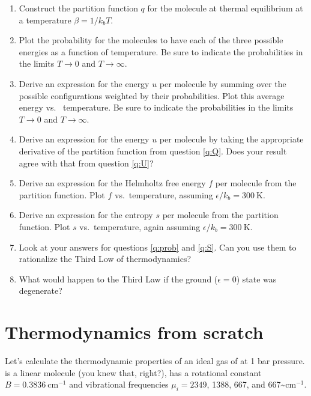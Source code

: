 \documentclass[11pt]{article}
\begin{document}
\begin{enumerate}
\item \label{q:Q} Construct the partition function \(q\) for the molecule at thermal equilibrium at a
temperature \(\beta = 1/k_b T\).
\item \label{q:prob} Plot the probability for the molecules to have each of the three possible energies
as a function of temperature.  Be sure to indicate the probabilities in the limits
\(T\rightarrow 0\) and \(T\rightarrow\infty\).
\item \label{q:U} Derive an expression for the energy \(u\) per molecule by summing over the possible
configurations weighted by their probabilities.  Plot this average energy vs.~
temperature.  Be sure to indicate the probabilities in the limits \(T\rightarrow 0\) and \(T\rightarrow\infty\).
\item Derive an expression for the energy \(u\) per molecule by taking the appropriate
derivative of the partition function from question \ref{q:Q}.  Does your result agree
with that from question \ref{q:U}?
\item Derive an expression for the Helmholtz free energy \(f\) per molecule from the
partition function.  Plot \(f\) vs.~temperature, assuming \(\epsilon/k_b=300~\text{K}\).
\item \label{q:S} Derive an expression for the entropy \(s\) per molecule from the
partition function.  Plot \(s\) vs.~temperature, again assuming \(\epsilon/k_b=300~\text{K}\).
\item Look at your answers for questions \ref{q:prob} and \ref{q:S}.  Can you use them
to rationalize the Third Low of thermodynamics?
\item What would happen to the Third Law if the ground (\(\epsilon = 0\)) state was degenerate?
\end{enumerate}

\section{Thermodynamics from scratch}
\label{sec:orgd4f0e7b}
Let's calculate the thermodynamic properties
of an ideal gas of  at 1 bar pressure.   is a linear molecule (you knew
that, right?), has a rotational constant \(B=0.3836~\text{cm}^{-1}\) and vibrational
frequencies \(\mu_i = 2349\), 1388, 667, and 667\textasciitilde{}cm\(^{-1}\).
\end{document}
